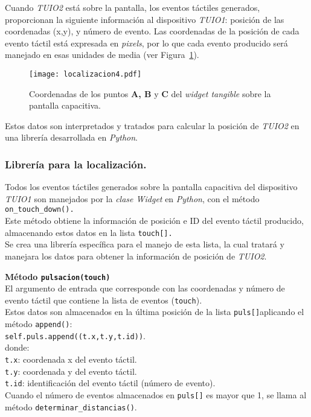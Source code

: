 Cuando \emph{TUIO2} está sobre la pantalla, los eventos táctiles generados, proporcionan la siguiente información al dispositivo \emph{TUIO1}: posición de las coordenadas (x,y), y número de evento. Las coordenadas de la posición de cada evento táctil está expresada en \emph{pixels}, por lo que cada evento producido será manejado en esas unidades de media (ver Figura~\ref{fig:Localizacion4}).\\
\begin{figure}[!h]
\begin{center}
\texttt{[image: localizacion4.pdf]}
\caption{Coordenadas de los puntos \textbf{A, B} y \textbf{C} del \emph{widget tangible} sobre la pantalla capacitiva. }
\label{fig:Localizacion4}
\end{center}
\end{figure}
Estos datos son interpretados y tratados para calcular la posición de \emph{TUIO2} en una librería desarrollada en \emph{Python}.

\subsubsection{Librería para la localización.}

Todos los eventos táctiles generados sobre la pantalla capacitiva del dispositivo \emph{TUIO1} son manejados por la \emph{clase Widget} en \emph{Python}, con el método \texttt{on\_touch\_down().}\\
Este método obtiene la información de posición e ID del evento táctil producido, almacenando estos datos en la lista \texttt{touch[].}\\
Se crea una librería específica para el manejo de esta lista, la cual tratará y manejara los datos para obtener la información de posición de \emph{TUIO2}.

\textbf{Método \texttt{pulsacion(touch)}}\\
El argumento de entrada que corresponde con las coordenadas y número de evento táctil que contiene la lista de eventos (\texttt{touch}).\\
Estos datos son almacenados en la última posición de la lista \texttt{puls[]}aplicando el método \texttt{append()}:\\
\texttt{self.puls.append((t.x,t.y,t.id))}.\\
donde: \\
\texttt{t.x}: coordenada x del evento táctil.\\
\texttt{t.y}: coordenada y del evento táctil.\\
\texttt{t.id}: identificación del evento táctil (número de evento).\\
Cuando el número de eventos almacenados en \texttt{puls[]} 
es mayor que 1, se llama al método \texttt{determinar\_distancias()}.

